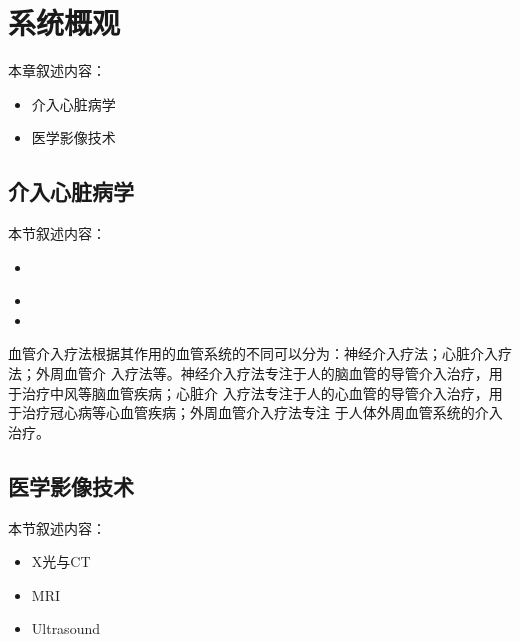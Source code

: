 \chapter{系统概观}
\label{chap3a}

本章叙述内容：
\begin{itemize}
  \item 介入心脏病学
  \item 医学影像技术
\end{itemize}

\section{介入心脏病学}

本节叙述内容：
\begin{itemize}
  \item　
  \item
  \item
\end{itemize}

血管介入疗法根据其作用的血管系统的不同可以分为：神经介入疗法；心脏介入疗法；外周血管介
入疗法等。神经介入疗法专注于人的脑血管的导管介入治疗，用于治疗中风等脑血管疾病；心脏介
入疗法专注于人的心血管的导管介入治疗，用于治疗冠心病等心血管疾病；外周血管介入疗法专注
于人体外周血管系统的介入治疗\cite{coles2011surveyCRaIVE}。

\section{医学影像技术}
\label{sec2-2}

本节叙述内容：
\begin{itemize}
  \item X光与CT \cite{Orosco2013Review}
  \item MRI
  \item Ultrasound
\end{itemize}
